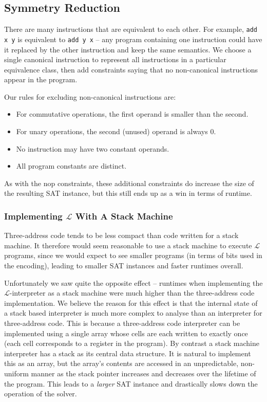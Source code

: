 \documentclass[a4paper]{llncs}
\begin{document}
\subsection{Symmetry Reduction}
There are many instructions that are equivalent to each other.  For example,
\verb|add x y| is equivalent to \verb|add y x| -- any program containing
one instruction could have it replaced by the other instruction and
keep the same semantics.  We choose a single canonical instruction to
represent all instructions in a particular equivalence class, then add
constraints saying that no non-canonical instructions appear in the program.

Our rules for excluding non-canonical instructions are:

\begin{itemize}
 \item For commutative operations, the first operand is smaller than the second.
 \item For unary operations, the second (unused) operand is always 0.
 \item No instruction may have two constant operands.
 \item All program constants are distinct.
\end{itemize}

As with the nop constraints, these additional constraints do increase the
size of the resulting SAT instance, but this still ends up as a win in
terms of runtime.

\subsubsection{Implementing $\mathcal{L}$ With A Stack Machine}
Three-address code tends to be less compact than code written for a stack
machine.  It therefore would seem reasonable to use a stack machine to
execute $\mathcal{L}$ programs, since we would expect to see smaller programs
(in terms of bits used in the encoding), leading to smaller SAT instances
and faster runtimes overall.

Unfortunately we saw quite the opposite effect -- runtimes when implementing the
$\mathcal{L}$-interpreter as a stack machine were much higher than the three-address
code implementation.  We believe the reason for this
effect is that the internal state of a stack based interpreter is much more complex
to analyse than an interpreter for three-address code.  This is because a
three-address code interpreter can be implemented using a single array whose cells are
each written to exactly once (each cell corresponds to a register in the program).
By contrast a stack machine interpreter has a stack as its central data structure.
It is natural to implement this as an array, but the array's contents are accessed
in an unpredictable, non-uniform manner as the stack pointer increases and decreases
over the lifetime of the program.  This leads to a \emph{larger} SAT
instance and drastically slows down the operation of the solver.
\end{document}
